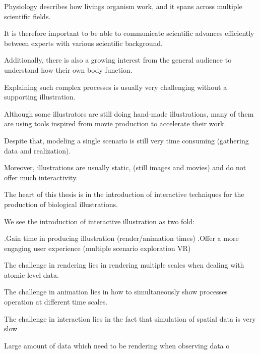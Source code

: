 Physiology describes how livings organism work, and it spans across multiple scientific fields.

It is therefore important to be able to communicate scientific advances efficiently between experts with various scientific background.

Additionally, there is also a growing interest from the general audience to understand how their own body function.

Explaining such complex processes is usually very challenging without a supporting illustration.

Although some illustrators are still doing hand-made illustrations, many of them are using tools inspired from movie production to accelerate their work.

Despite that, modeling a single scenario is still very time consuming (gathering data and realization).

Moreover, illustrations are usually static, (still images and movies) and do not offer much interactivity.

The heart of this thesis is in the introduction of interactive techniques for the production of biological illustrations.

We see the introduction of interactive illustration as two fold:

.Gain time in producing illustration (render/animation times)
.Offer a more engaging user experience (multiple scenario exploration VR)

The challenge in rendering lies in rendering multiple scales when dealing with atomic level data.



The challenge in animation lies in how to simultaneously show processes operation at different time scales.

The challenge in interaction lies in the fact that simulation of spatial data is very slow

Large amount of data which need to be rendering when observing data o



%
%
%
%
% 
%
%
%
%




